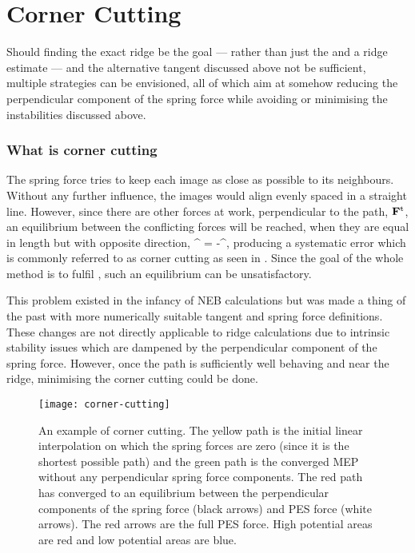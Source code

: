\section{Corner Cutting}
\label{sec:erm-corner-cutting}
Should finding the exact ridge be the goal --- rather than just the  and a ridge estimate --- and the alternative tangent discussed above not be sufficient, multiple strategies can be envisioned, all of which aim at somehow reducing the perpendicular component of the spring force while avoiding or minimising the instabilities discussed above.

\subsubsection{What is corner cutting}
The spring force tries to keep each image as close as possible to its neighbours.
Without any further influence, the images would align evenly spaced in a straight line.
However, since there are other forces at work, perpendicular to the path, ${\mathrm{\mathbf{\bm{F}}}}^\text{t}$, an equilibrium between the conflicting forces will be reached, when they are equal in length but with opposite direction,
\vF^{\perp} = -\vF^,
\eeq
producing a systematic error which is commonly referred to as corner cutting as seen in .
Since the goal of the whole method is to fulfil , such an equilibrium can be unsatisfactory.

This problem existed in the infancy of NEB calculations but was made a thing of the past with more numerically suitable tangent and spring force definitions.~\cite{neb-tangent-2000}
These changes are not directly applicable to ridge calculations due to intrinsic stability issues which are dampened by the perpendicular component of the spring force.
However, once the path is sufficiently well behaving and near the ridge, minimising the corner cutting could be done.

\begin{SCfigure}[5.0][h]
\centering
\texttt{[image: corner-cutting]}
\caption{
An example of corner cutting.
The yellow path is the initial linear interpolation on which the spring forces are zero (since it is the shortest possible path) and the green path is the converged MEP without any perpendicular spring force components.
The red path has converged to an equilibrium between the perpendicular components of the spring force (black arrows) and PES force (white arrows).
The red arrows are the full PES force.
High potential areas are red and low potential areas are blue.
}
\label{fig:corner-cutting}
\end{SCfigure}

